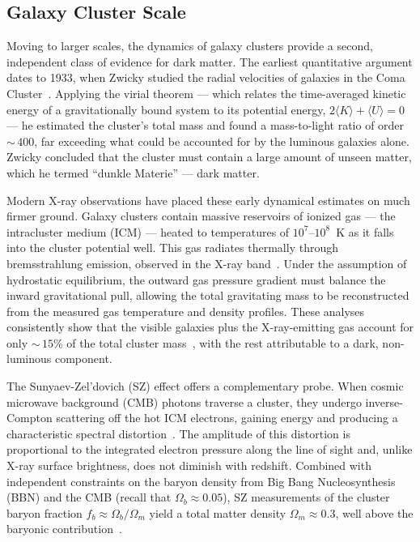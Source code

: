 \subsection{Galaxy Cluster Scale}
\label{sec:1.1.2}

Moving to larger scales, the dynamics of galaxy clusters provide a second, independent class of evidence for dark matter.
The earliest quantitative argument dates to 1933, when Zwicky studied the radial velocities of galaxies in the Coma Cluster~\cite{Zwicky:1933}.
Applying the virial theorem --- which relates the time-averaged kinetic energy of a gravitationally bound system to its potential energy, $2\langle K \rangle + \langle U \rangle = 0$ --- he estimated the cluster's total mass and found a mass-to-light ratio of order ${\sim}\,400$, far exceeding what could be accounted for by the luminous galaxies alone.
Zwicky concluded that the cluster must contain a large amount of unseen matter, which he termed ``dunkle Materie'' --- dark matter.

Modern X-ray observations have placed these early dynamical estimates on much firmer ground.
Galaxy clusters contain massive reservoirs of ionized gas --- the intracluster medium (ICM) --- heated to temperatures of $10^7$--$10^8$~K as it falls into the cluster potential well.
This gas radiates thermally through bremsstrahlung emission, observed in the X-ray band~\cite{Sarazin:1986zz}.
Under the assumption of hydrostatic equilibrium, the outward gas pressure gradient must balance the inward gravitational pull, allowing the total gravitating mass to be reconstructed from the measured gas temperature and density profiles.
These analyses consistently show that the visible galaxies plus the X-ray-emitting gas account for only ${\sim}\,15\%$ of the total cluster mass~\cite{Cirelli:2024ssz}, with the rest attributable to a dark, non-luminous component.

The Sunyaev-Zel'dovich (SZ) effect offers a complementary probe.
When cosmic microwave background (CMB) photons traverse a cluster, they undergo inverse-Compton scattering off the hot ICM electrons, gaining energy and producing a characteristic spectral distortion~\cite{Cirelli:2024ssz,Bullock:2017xww}.
The amplitude of this distortion is proportional to the integrated electron pressure along the line of sight and, unlike X-ray surface brightness, does not diminish with redshift.
Combined with independent constraints on the baryon density from Big Bang Nucleosynthesis (BBN) and the CMB (recall that $\Omega_b \approx 0.05$), SZ measurements of the cluster baryon fraction $f_b \approx \Omega_b / \Omega_m$ yield a total matter density $\Omega_m \approx 0.3$, well above the baryonic contribution~\cite{Aghanim:2018eyx,Cirelli:2024ssz}.


